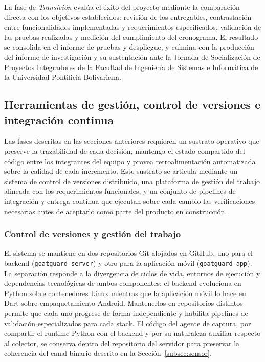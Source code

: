 La fase de \textit{Transición} evalúa el éxito del proyecto mediante 
la comparación directa con los objetivos establecidos: revisión de 
los entregables, contrastación entre funcionalidades implementadas y 
requerimientos especificados, validación de las pruebas realizadas y 
medición del cumplimiento del cronograma. El resultado se consolida 
en el informe de pruebas y despliegue, y culmina con la producción 
del informe de investigación y su sustentación ante 
la Jornada de Socialización de Proyectos Integradores de la Facultad 
de Ingeniería de Sistemas e Informática de la Universidad Pontificia 
Bolivariana.

\subsection{Herramientas de gestión, control de versiones e integración continua}

Las fases descritas en las secciones anteriores requieren un sustrato
operativo que preserve la trazabilidad de cada decisión, mantenga el
estado compartido del código entre los integrantes del equipo y provea
retroalimentación automatizada sobre la calidad de cada incremento.
Este sustrato se articula mediante un sistema de control de versiones
distribuido, una plataforma de gestión del trabajo alineada con los
requerimientos funcionales, y un conjunto de pipelines de integración
y entrega continua que ejecutan sobre cada cambio las verificaciones
necesarias antes de aceptarlo como parte del producto en
construcción.

\subsubsection{Control de versiones y gestión del trabajo}

El sistema se mantiene en dos repositorios Git alojados en GitHub,
uno para el backend (\texttt{goatguard-server}) y otro para la
aplicación móvil (\texttt{goatguard-app}). La separación responde a
la divergencia de ciclos de vida, entornos de ejecución y
dependencias tecnológicas de ambos componentes: el backend evoluciona
en Python sobre contenedores Linux mientras que la aplicación móvil
lo hace en Dart sobre empaquetamiento Android. Mantenerlos en
repositorios distintos permite que cada uno progrese de forma
independiente y habilita pipelines de validación especializados para
cada stack. El código del agente de captura, por compartir el
runtime Python con el backend y por su naturaleza auxiliar respecto
al colector, se conserva dentro del repositorio del servidor para
preservar la coherencia del canal binario descrito en la
Sección~\ref{subsec:sensor}.

